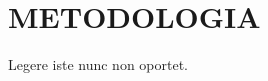 

\section{\textbf{METODOLOGIA}}
    \label{cha:metodologia}

    
    Legere iste nunc non oportet.

    
    

\newpage
